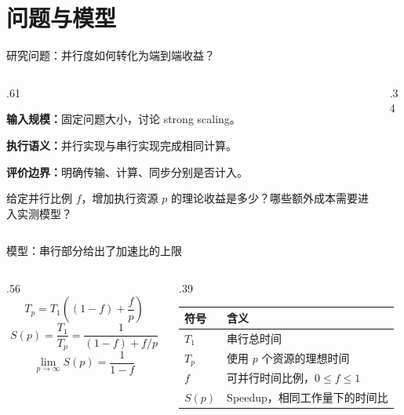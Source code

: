 \section{问题与模型}
\begin{frame}{研究问题：并行度如何转化为端到端收益？}
\begin{columns}[T,onlytextwidth]
\begin{column}{.61\textwidth}
\begin{denseitems}
\item \textbf{输入规模：}固定问题大小，讨论 strong scaling。
\item \textbf{执行语义：}并行实现与串行实现完成相同计算。
\item \textbf{评价边界：}明确传输、计算、同步分别是否计入。
\end{denseitems}
\vspace{3mm}
给定并行比例 $f$，增加执行资源 $p$ 的理论收益是多少？哪些额外成本需要进入实测模型？
\end{column}
\begin{column}{.34\textwidth}
\par\vspace{7mm}
\par\vspace{6mm}
\end{column}
\end{columns}
\end{frame}

\begin{frame}{模型：串行部分给出了加速比的上限}
\begin{columns}[T,onlytextwidth]
\begin{column}{.56\textwidth}
\[T_p=T_1\left((1-f)+\frac{f}{p}\right)\]
\[\boxed{S(p)=\frac{T_1}{T_p}=\frac{1}{(1-f)+f/p}}\]
\vspace{3mm}
\[\lim_{p\to\infty} S(p)=\frac{1}{1-f}\]
\end{column}
\begin{column}{.39\textwidth}
\begin{tabularx}{\linewidth}{@{}lX@{}}
\toprule 符号 & 含义 \\\midrule
$T_1$ & 串行总时间 \\
$T_p$ & 使用 $p$ 个资源的理想时间 \\
$f$ & 可并行时间比例，$0\le f\le1$ \\
$S(p)$ & Speedup，相同工作量下的时间比 \\\bottomrule
\end{tabularx}
\vspace{4mm}
\end{column}
\end{columns}
\end{frame}

